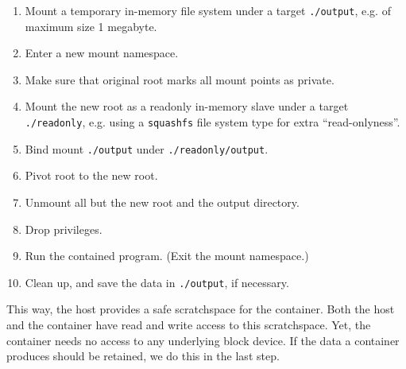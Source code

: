 \begin{enumerate}

\item Mount a temporary in-memory file system under a target \texttt{./output},
e.g. of maximum size 1 megabyte.

\item Enter a new mount namespace.

\item Make sure that original root marks all mount points as private.

\item Mount the new root as a readonly in-memory slave under a target
\texttt{./readonly}, e.g. using a \texttt{squashfs} file system type for extra
``read-onlyness''.

\item Bind mount \texttt{./output} under \texttt{./readonly/output}.

\item Pivot root to the new root.

\item Unmount all but the new root and the output directory.

\item Drop privileges.

\item Run the contained program. (Exit the mount namespace.)

\item Clean up, and save the data in \texttt{./output}, if necessary.

\end{enumerate}

This way, the host provides a safe scratchspace for the container. Both the
host and the container have read and write access to this scratchspace.  Yet,
the container needs no access to any underlying block device. If the data a
container produces should be retained, we do this in the last step.
